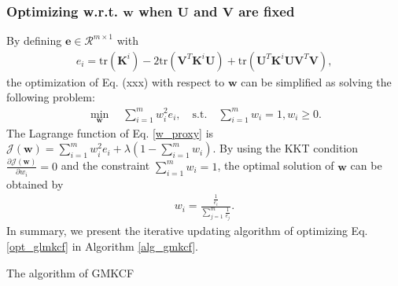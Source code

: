 \documentclass[10pt,journal,compsoc]{IEEEtran}
\newcommand{\st}{\mathrm{s.t.}}
\newcommand{\tr}{\mathrm{tr}}
\begin{document}
\subsubsection{Optimizing w.r.t. $\mathbf{w}$ when $\mathbf{U}$ and $\mathbf{V}$ are fixed}
By defining $\mathbf{e} \in \mathcal{R}^{m \times 1}$ with 
\begin{align}
e_i = \tr(\mathbf{K}^{i}) - 2 \tr(\mathbf{V}^T \mathbf{K}^{i} \mathbf{U}) + \tr(\mathbf{U}^T \mathbf{K}^{i} \mathbf{U} \mathbf{V}^T \mathbf{V}),
\end{align}
the optimization of Eq. (xxx) with respect to $\mathbf{w}$ can be simplified as solving the following problem:
\begin{align}\label{w_proxy}
\min_{\mathbf{w}} \quad \sum_{i=1}^{m} w_i^2 e_i, \quad \st \quad \sum_{i=1}^{m} w_i = 1, w_i \geq 0.
\end{align}
The Lagrange function of Eq. \eqref{w_proxy} is $\mathcal{J}(\mathbf{w}) = \sum_{i=1}^{m} w_i^2 e_i + \lambda (1 - \sum_{i=1}^{m}w_i)$. By using the KKT condition $\frac{\partial \mathcal{J}(\mathbf{w})}{\partial w_i} = 0$ and the constraint $\sum_{i=1}^{m} w_i = 1$, the optimal solution of $\mathbf{w}$ can be obtained by
\begin{align}\label{update_w}
  w_i = \frac{\frac{1}{e_i}}{\sum_{j=1}^{m} \frac{1}{e_j}}.
\end{align}
In summary, we present the iterative updating algorithm of optimizing Eq. \eqref{opt_glmkcf} in Algorithm \ref{alg_gmkcf}.
\begin{algorithm}
    \caption{The algorithm of GMKCF}
  \label{alg_gmkcf}
  \begin{algorithmic}
  \REPEAT
  \end{algorithmic}
\end{algorithm}
\end{document}
